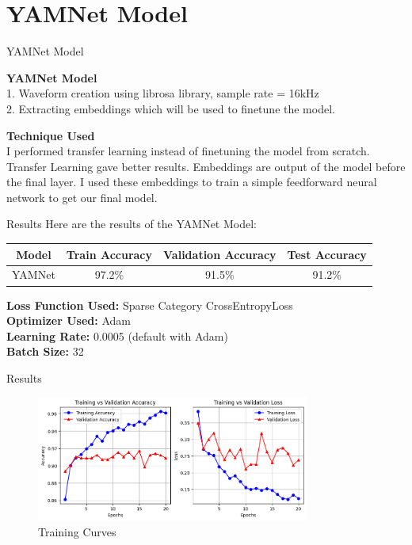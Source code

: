 \documentclass{beamer}
\begin{document}
\section*{YAMNet Model}
\begin{frame}{YAMNet Model}

    \textbf{YAMNet Model} \\
    1. Waveform creation using librosa library, sample rate = 16kHz \\
    2. Extracting embeddings which will be used to finetune the model. \\
    
    \bigskip 

    \textbf{Technique Used} \\
    I performed transfer learning instead of finetuning the model from scratch. Transfer Learning gave better results. Embeddings are output of the model before the final layer. I used these embeddings to train a simple feedforward neural network to get our final model. 
\end{frame}

\begin{frame}{Results}
    Here are the results of the YAMNet Model:
    \begin{table}[h]
        \centering
        \begin{tabular}{|c|c|c|c|}
            \hline
            \textbf{Model} & \textbf{Train Accuracy} & \textbf{Validation Accuracy} & \textbf{Test Accuracy} \\
            \hline
            YAMNet & 97.2\% & 91.5\% & 91.2\% \\
            \hline
        \end{tabular}
    \end{table}

    \textbf{Loss Function Used:} Sparse Category CrossEntropyLoss \\
    \textbf{Optimizer Used:} Adam \\
    \textbf{Learning Rate:} 0.0005 (default with Adam) \\
    \textbf{Batch Size:} 32 \\
\end{frame}

\begin{frame}{Results}
    
    \begin{figure}
        \centering
        \includegraphics[width=0.8\textwidth]{yamnet1.png}
        \caption{Training Curves}
    \end{figure}

\end{frame}
\end{document}
